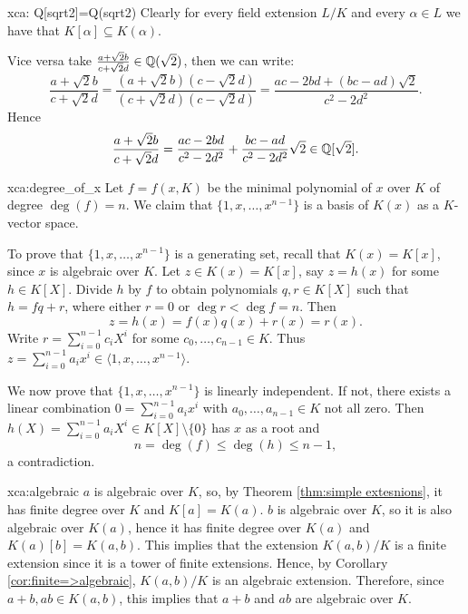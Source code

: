 \begin{sol}{xca: Q[sqrt2]=Q(sqrt2)}
Clearly for every field extension $L/K$ and 
    every $\alpha\in L$ we have that
    $K[\alpha]\subseteq K(\alpha)$.

    Vice versa take $\frac{a+\sqrt{2}b}{c+\sqrt{2}d}\in \mathbb{Q}(\sqrt{2})$,
    then we can write:
    \[
    \frac{a+\sqrt{2}b}{c+\sqrt{2}d}=\frac{(a+\sqrt{2}b)(c-\sqrt{2}d)}{(c+\sqrt{2}d)(c-\sqrt{2}d)}=
    \frac{ac-2bd+(bc-ad)\sqrt{2}}{c^2-2d^2}.
    \]
    Hence
    \[
    \frac{a+\sqrt{2}b}{c+\sqrt{2}d}=\frac{ac-2bd}{c^2-2d^2}+\frac{bc-ad}{c^2-2d^2}\sqrt{2}\in \mathbb{Q}[\sqrt{2}].
    \]
\end{sol}


\begin{sol}{xca:degree_of_x}
    Let $f=f(x,K)$ be the minimal polynomial of $x$ over $K$ of degree $\deg(f)=n$.
    We claim that $\{1,x,\dots, x^{n-1}\}$ is a basis of $K(x)$ as a $K$-vector space. 

    To prove that $\{1,x,\dots, x^{n-1}\}$ is a generating set, recall that $K(x)=K[x]$, since $x$ is algebraic over $K$. 
    Let $z\in K(x)=K[x]$, say $z=h(x)$ for some $h\in K[X]$. 
    Divide $h$ by $f$ to obtain polynomials $q,r\in K[X]$ 
    such that $h=fq+r$, where either $r=0$ or $\deg r<\deg f=n$. Then 
    \[
		z=h(x)=f(x)q(x)+r(x)=r(x).
	\]
	Write $r=\sum_{i=0}^{n-1}c_iX^i$ for some $c_0,\dots,c_{n-1}\in K$. 
    Thus $z=\sum_{i=0}^{n-1}a_ix^i\in \langle 1,x,\dots,x^{n-1}\rangle$.
        
    We now prove that $\{1,x,\dots, x^{n-1}\}$ is linearly independent. If not, 
    there exists a linear combination
    $0=\sum_{i=0}^{n-1}a_ix^i$ with $a_0,\dots,a_{n-1}\in K$ not all zero. 
    Then $h(X)=\sum_{i=0}^{n-1}a_iX^i\in K[X]\setminus\{0\}$
    has $x$ as a root and 
        \[
        n=\deg(f)\leq \deg(h)\leq n-1,
        \]
       a contradiction. 
\end{sol}

\begin{sol}{xca:algebraic}
$a$ is algebraic over $K$, 
so, by Theorem \ref{thm:simple extesnions},
it has finite degree over $K$
and $K[a]=K(a)$.
$b$ is algebraic over $K$,
so it is also algebraic over $K(a)$, hence it has finite degree over $K(a)$ and 
$K(a)[b]=K(a,b)$.
This implies that the extension
$K(a,b)/K$ is a finite extension
since it is a tower of finite extensions.
Hence, by Corollary \ref{cor:finite=>algebraic}, $K(a,b)/K$ is an algebraic extension.
Therefore, since $a+b,ab\in K(a,b)$,
this implies that $a+b$ and $ab$
are algebraic over $K$.
\end{sol}

